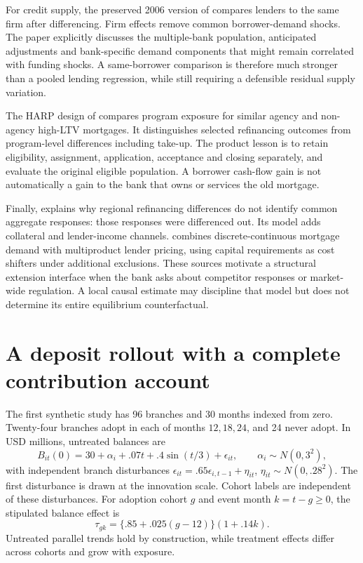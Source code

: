For credit supply, the preserved 2006 version of
\citet[Section III.B, equation (5)]{mian2006} compares lenders to the same
firm after differencing. Firm effects remove common borrower-demand
shocks. The paper explicitly discusses the multiple-bank population,
anticipated adjustments and bank-specific demand components that might
remain correlated with funding shocks. A same-borrower comparison is
therefore much stronger than a pooled lending regression, while still
requiring a defensible residual supply variation.

The HARP design of \citet[printed pp.2--3]{agarwal2020} compares program
exposure for similar agency and non-agency high-LTV mortgages. It
distinguishes selected refinancing outcomes from program-level
differences including take-up. The product lesson is to retain eligibility,
assignment, application, acceptance and closing separately, and evaluate
the original eligible population. A borrower cash-flow gain is not
automatically a gain to the bank that owns or services the old mortgage.

Finally, \citet[printed pp.112--113]{beraja2019} explains why regional
refinancing differences do not identify common aggregate responses:
those responses were differenced out. Its model adds collateral and
lender-income channels. \citet[pp.5--6]{benetton2021} combines
discrete-continuous mortgage demand with multiproduct lender pricing,
using capital requirements as cost shifters under additional exclusions.
These sources motivate a structural extension interface when the bank
asks about competitor responses or market-wide regulation. A local
causal estimate may discipline that model but does not determine its
entire equilibrium counterfactual.

\section{A deposit rollout with a complete contribution account}
\label{r3:deposit-study}

The first synthetic study has 96 branches and 30 months indexed from zero.
Twenty-four branches adopt in each of months $12,18,24$, and 24 never
adopt. In USD millions, untreated balances are
\[
 B_{it}(0)=30+\alpha_i+.07t+.4\sin(t/3)+\epsilon_{it},
 \qquad \alpha_i\sim N(0,3^2),
\]
with independent branch disturbances
$\epsilon_{it}=.65\epsilon_{i,t-1}+\eta_{it}$,
$\eta_{it}\sim N(0,.28^2)$. The first disturbance is drawn at the
innovation scale. Cohort labels are independent of these disturbances.
For adoption cohort $g$ and event month $k=t-g\ge0$, the stipulated
balance effect is
\[
 \tau_{gk}=\{.85+.025(g-12)\}(1+.14k).
\]
Untreated parallel trends hold by construction, while treatment effects
differ across cohorts and grow with exposure.

